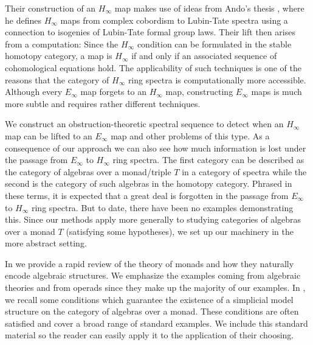 \documentclass[leqno,oneside,english]{elsarticle}
\begin{document}
Their construction of an $H_\infty$ map makes use of ideas from Ando's
thesis \cite{And92,And95}, where he defines $H_\infty$ maps from
complex cobordism to Lubin-Tate spectra using a connection to
isogenies of Lubin-Tate formal group laws. Their lift then arises from
a computation: Since the $H_\infty$ condition can be formulated in the
stable homotopy category, a map is $H_\infty$ if and only if an
associated sequence of cohomological equations hold. The applicability
of such techniques is one of the reasons that the category of
$H_\infty$ ring spectra is computationally more
accessible. Although every $E_\infty$ map forgets to an $H_\infty$ map,
constructing $E_\infty$ maps is much more subtle and requires rather
different techniques.

We construct an obstruction-theoretic spectral sequence to detect when
an $H_\infty$ map can be lifted to an $E_\infty$ map and other
problems of this type. As a consequence of our approach we can also
see how much information is lost under the passage from
$E_\infty$ to $H_\infty$ ring spectra. The first category can be
described as the category of algebras over a monad/triple $T$
in a category of spectra while the second is the category of such
algebras in the homotopy category. Phrased in these terms, it is
expected that a great deal is forgotten in the passage from $E_\infty$
to $H_\infty$ ring spectra. But to date, there have been no examples
demonstrating this. Since our methods apply more generally to studying
categories of algebras over a monad $T$ (satisfying some hypotheses),
we set up our machinery in the more abstract setting.

In  we provide a rapid review of the theory of
monads and how they naturally encode algebraic structures. We
emphasize the examples coming from algebraic theories and from operads
since they make up the majority of our examples. In
, we recall some conditions
which guarantee the existence of a simplicial model structure on the
category of algebras over a monad. These conditions are often
satisfied and cover a broad range of standard examples. We include
this standard material so the reader can easily apply it to the
application of their choosing.
\end{document}
